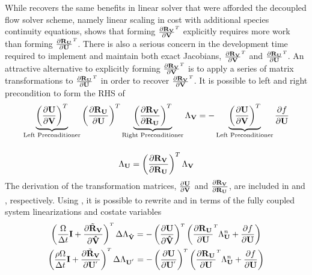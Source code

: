 While 
recovers the same benefits in linear solver that were afforded the decoupled
flow solver scheme, namely linear scaling in cost with additional species
continuity equations,  shows that forming
$\drvdv$ explicitly requires more work than forming
$\drudu$.  There is also a serious concern in the development time
required to implement and maintain both exact Jacobians, $\drvdv$ and $\drudu$.
An attractive alternative to explicitly forming $\drvdv$ is to apply a series of
matrix transformations to $\drudu$ in order to recover $\drvdv$.  It is possible
to left and right precondition  to form the RHS of
\begin{gather}
  \underbrace{
    \left( \frac{\partial \mathbf U}{\partial \mathbf V} \right)^{T}
  }_\text{Left Preconditioner}
  \left( \frac{\partial \mathbf R_{{\mathbf U}_{}}}{\partial \mathbf U} \right)^{T}
  \underbrace{
    \left( \frac{\partial \mathbf R_{{\mathbf V}_{}}}{\partial \mathbf R_{{\mathbf U}_{}}} \right)^{T}
  }_\text{Right Preconditioner}
  \Lambda_{\mathbf V}
  = 
  -
  \underbrace{
    \left( \frac{\partial \mathbf U}{\partial \mathbf V} \right)^{T}
  }_\text{Left Preconditioner}
  \frac{\partial f}{\partial \mathbf U} 
  \label{fc-to-dc-adj} \\[12pt]
  \Lambda_{\mathbf U} = \left( \frac{\partial \mathbf R_{{\mathbf V}_{}}}{\partial \mathbf R_{{\mathbf U}_{}}} \right)^{T} \Lambda_{\mathbf V}
  \label{right-precond}
\end{gather}
The derivation of the transformation matrices, $\frac{\partial \mathbf U}{\partial \mathbf V}$ and
$\frac{\partial \mathbf R_{{\mathbf V}_{}}}{\partial \mathbf R_{{\mathbf U}_{}}}$, are included in  and
, respectively.  Using
, it is possible to rewrite
 and  in terms of the fully
coupled system linearizations and costate variables
\begin{gather}
  \left(
  \frac{\vol}{\Delta t} \mi + \pd{\tilde{\vR}_{\mv}}{\Vhat}
  \right)^{\mathsmaller T} \Delta \adjlam{\Vhat}
  =
  - \left( \pd{\mU}{\Vhat} \right)^{\mathsmaller T}
  \left(\pd{\ru{}}{\mU}^{\mathsmaller T}\adjlam{\mU}^n + \pd{f}{\mU} \right)
  \label{dc-fc-species-adj-time} \\
  \left(
  \frac{\rho \vol}{\Delta t} \mi + \pd{\tilde{\vR}_{\mv}}{\Up}
  \right)^{\mathsmaller T} \Delta \adjlam{\Up}
  =
  - \left( \pd{\mU}{\Up} \right)^{\mathsmaller T}
  \left(\pd{\ru{}}{\mU}^{\mathsmaller T}\adjlam{\mU}^n + \pd{f}{\mU} \right)
  \label{dc-fc-mixture-adj-time}
\end{gather}
